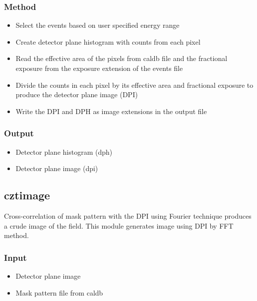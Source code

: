 \documentclass[11pt,oneside,a4paper]{article}
\begin{document}
\subsubsection*{Method}
\begin{itemize}
\item{Select the events based on user specified energy range}
\item{Create detector plane histogram with counts from each pixel}
\item{Read the effective area of the pixels from caldb file and the 
fractional exposure from the exposure extension of the events file}
\item{Divide the counts in each pixel by its effective area and fractional 
exposure to produce the detector plane image (DPI)}
\item{Write the DPI and DPH as image extensions in the output file}
\end{itemize}
\subsubsection*{Output}
\begin{itemize}
\item{Detector plane histogram (dph)}
\item{Detector plane image (dpi)}
\end{itemize}


\subsection{cztimage}
Cross-correlation of mask pattern with the DPI using Fourier technique 
produces a crude image of the field. This module generates image using 
DPI by FFT method.

\subsubsection*{Input}
\renewcommand\labelitemi{{\boldmath$\cdot$}}
\begin{itemize}
\item{Detector plane image}
\item{Mask pattern file from caldb}
\end{itemize}
\end{document}
